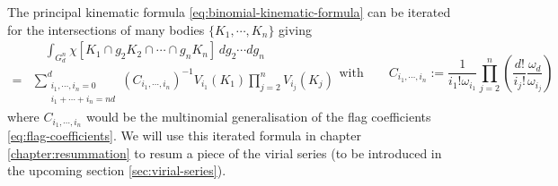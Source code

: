 The principal kinematic formula \eqref{eq:binomial-kinematic-formula} can be iterated for the intersections of many bodies $\{K_1, \cdots, K_n\}$ giving \cite{Santalo2004,MarechalPRE2014}
\begin{subequations}\label{eq:multinomial-kinematic-formula}
  \begin{equation}
    \begin{split}
      & \quad
      \int_{G_d^n} \chi[K_1 \cap g_2 K_2 \cap \cdots \cap g_n K_n]
      \, dg_2 \cdots dg_n
      \\ = &
      \sum_{\substack{i_1, \cdots, i_n = 0 \\ i_1 + \cdots + i_n = nd}}^d
      (C_{i_1, \cdots, i_n})^{-1}
      V_{i_1}(K_1)
      \prod_{j=2}^n
      V_{i_j}(K_j)
    \end{split}
  \end{equation}
  \begin{equation}
    \textrm{with} \qquad
    C_{i_1, \cdots, i_n}
    := \frac{1}{i_1! \omega_{i_1}}
    \prod_{j=2}^n
    \left(
    \frac{d!}{i_j!} \frac{\omega_d}{\omega_{i_j}}
    \right)
  \end{equation}
\end{subequations}
where $C_{i_1, \cdots, i_n}$ would be the multinomial generalisation of the flag coefficients \eqref{eq:flag-coefficients}.
We will use this iterated formula in chapter \ref{chapter:resummation} to resum a piece of the virial series (to be introduced in the upcoming section \ref{sec:virial-series}).



